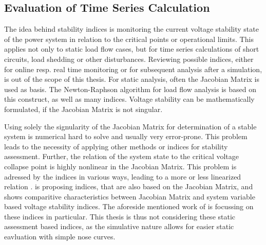 \subsection{Evaluation of Time Series Calculation}
\label{sec:stability-indices}

The idea behind stability indices is monitoring the current voltage stability state of the power system in relation to the critical points or operational limits.
This applies not only to static load flow cases, but for time series calculations of short circuits, load shedding or other disturbances.
Reviewing possible indices, either for online resp. real time monitoring or for subsequent analysis after a simulation, is out of the scope of this thesis.
For static analysis, often the Jacobian Matrix is used as basis.
The Newton-Raphson algorithm for load flow analysis is based on this construct, as well as many indices.
Voltage stability can be mathematically formulated, if the Jacobian Matrix is not singular.


Using solely the signularity of the Jacobian Matrix for determination of a stable system is numerical hard to solve and usually very error-prone.
This problem leads to the necessity of applying other methods or indices for stability assessment. 
Further, the relation of the system state to the critical voltage collapse point is highly nonlinear in the Jacobian Matrix. 
This problem is adressed by the indices in various ways, leading to a more or less linearized relation \autocite{machowski_2020,danish_2015}. 
\textcite{danish_2015} is proposing indices, that are also based on the Jacobian Matrix, and shows comparitive characteristics between Jacobian Matrix and system variable based voltage stability indices. 
The aforeside mentioned work of \textcite{doigcardet_2010} is focussing on these indices in particular.
This thesis is thus not considering these static assessment based indices, as the simulative nature allows for easier static eavluation with simple nose curves. 

